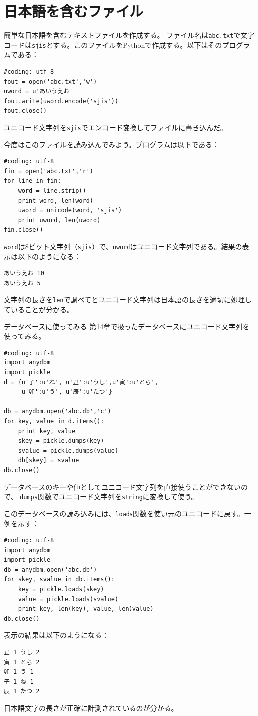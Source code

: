 \documentclass[a4j,12pt,makeidx]{jbook}
\begin{document}
\section{日本語を含むファイル}
簡単な日本語を含むテキストファイルを作成する。
ファイル名は{\tt abc.txt}で文字コードは{\tt sjis}とする。このファイルをPythonで作成する。以下はそのプログラムである：
\begin{verbatim}
#coding: utf-8
fout = open('abc.txt','w')
uword = u'あいうえお'
fout.write(uword.encode('sjis'))
fout.close()
\end{verbatim}
ユニコード文字列を{\tt sjis}でエンコード変換してファイルに書き込んだ。 \par
今度はこのファイルを読み込んでみよう。プログラムは以下である：
\begin{verbatim}
#coding: utf-8
fin = open('abc.txt','r')
for line in fin:
    word = line.strip()
    print word, len(word)
    uword = unicode(word, 'sjis')
    print uword, len(uword)
fin.close()
\end{verbatim}
{\tt word}は8ビット文字列（{\tt sjis}）で、{\tt uword}はユニコード文字列である。結果の表示は以下のようになる：
\begin{verbatim}
あいうえお 10
あいうえお 5
\end{verbatim}
文字列の長さを{\tt len}で調べてとユニコード文字列は日本語の長さを適切に処理していることが分かる。\par
データベースに使ってみる
第14章で扱ったデータベースにユニコード文字列を使ってみる。
\begin{verbatim}
#coding: utf-8
import anydbm
import pickle
d = {u'子':u'ね', u'丑':u'うし',u'寅':u'とら',
     u'卯':u'う', u'辰':u'たつ'}
     
db = anydbm.open('abc.db','c')
for key, value in d.items():
    print key, value
    skey = pickle.dumps(key)
    svalue = pickle.dumps(value)
    db[skey] = svalue
db.close()
\end{verbatim}
データベースのキーや値としてユニコード文字列を直接使うことができないので、
{\tt dumps}関数でユニコード文字列を{\tt string}に変換して使う。\par
このデータベースの読み込みには、{\tt loads}関数を使い元のユニコードに戻す。一例を示す：
\begin{verbatim}
#coding: utf-8
import anydbm
import pickle
db = anydbm.open('abc.db')
for skey, svalue in db.items():
    key = pickle.loads(skey)
    value = pickle.loads(svalue)
    print key, len(key), value, len(value)
db.close()
\end{verbatim}
表示の結果は以下のようになる：
\begin{verbatim}
丑 1 うし 2
寅 1 とら 2
卯 1 う 1
子 1 ね 1
辰 1 たつ 2
\end{verbatim}
日本語文字の長さが正確に計測されているのが分かる。\\
\end{document}
